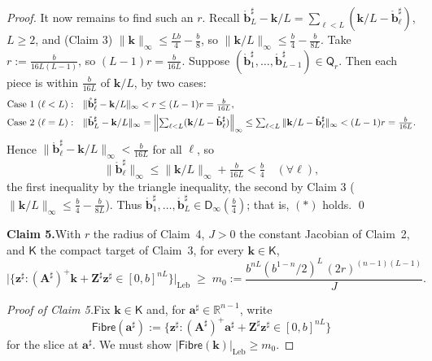 \documentclass[11pt]{article}
\theoremstyle{definition}
\begin{document}
\begin{proof}
\smallskip
\noindent It now remains to find such an $r$. Recall $\mathring{\mathbf{b}}^{\sharp}_L-\mathbf{k}/L=\sum_{\ell<L}(\mathbf{k}/L-\mathring{\mathbf{b}}^{\sharp}_\ell)$, $L\geq 2$, and (Claim 3) $\|\mathbf{k}\|_\infty\leq\tfrac{Lb}{4}-\tfrac{b}{8}$, so $\|\mathbf{k}/L\|_\infty\leq\tfrac{b}{4}-\tfrac{b}{8L}$. Take $r:=\tfrac{b}{16L(L-1)}$, so $(L-1)r=\tfrac{b}{16L}$. Suppose $(\mathring{\mathbf{b}}^{\sharp}_1,\ldots,\mathring{\mathbf{b}}^{\sharp}_{L-1})\in\mathsf{Q}_r$. Then each piece is within $\tfrac{b}{16L}$ of $\mathbf{k}/L$, by two cases:
\begin{align*}
\text{Case 1}\ (\ell<L):\quad
  &\|\mathring{\mathbf{b}}^{\sharp}_\ell-\mathbf{k}/L\|_\infty < r \leq (L-1)r = \tfrac{b}{16L}, \\
\text{Case 2}\ (\ell=L):\quad
  &\|\mathring{\mathbf{b}}^{\sharp}_L-\mathbf{k}/L\|_\infty = \Bigl\|\textstyle\sum_{\ell<L}(\mathbf{k}/L-\mathring{\mathbf{b}}^{\sharp}_\ell)\Bigr\|_\infty \leq \textstyle\sum_{\ell<L}\|\mathbf{k}/L-\mathring{\mathbf{b}}^{\sharp}_\ell\|_\infty < (L-1)r = \tfrac{b}{16L}.
\end{align*}
Hence $\|\mathring{\mathbf{b}}^{\sharp}_\ell-\mathbf{k}/L\|_\infty<\tfrac{b}{16L}$ for all $\ell$, so
\[
  \|\mathring{\mathbf{b}}^{\sharp}_\ell\|_\infty \leq \|\mathbf{k}/L\|_\infty + \tfrac{b}{16L} < \tfrac{b}{4} \quad(\forall\ell),
\]
the first inequality by the triangle inequality, the second by Claim 3 ($\|\mathbf{k}/L\|_\infty\leq\tfrac{b}{4}-\tfrac{b}{8L}$). Thus $\mathring{\mathbf{b}}^{\sharp}_1,\ldots,\mathring{\mathbf{b}}^{\sharp}_L\in\mathsf{D}_\infty(\tfrac{b}{4})$; that is, $(\ast)$ holds. \qed

\smallskip\noindent\textbf{Claim 5.}\quad With $r$ the radius of Claim~4, $J>0$ the constant Jacobian of Claim~2, and $\mathsf{K}$ the compact target of Claim~3, for every $\mathbf{k}\in\mathsf{K}$,
\[
  \bigl|\{\mathbf{z}^{\sharp} : (\mathbf{A}^{\sharp})^{+}\mathbf{k}+\mathbf{Z}^{\sharp}\mathbf{z}^{\sharp}\in[0,b]^{nL}\}\bigr|_{\mathrm{Leb}} \;\geq\; m_0 := \frac{b^{nL}(b^{1-n}/2)^L\,(2r)^{(n-1)(L-1)}}{J}.
\]

\noindent\emph{Proof of Claim 5.}\quad Fix $\mathbf{k}\in\mathsf{K}$ and, for $\mathbf{a}^{\sharp}\in\mathbb{R}^{n-1}$, write
\[
  \mathsf{Fibre}(\mathbf{a}^{\sharp}) := \{\mathbf{z}^{\sharp} : (\mathbf{A}^{\sharp})^{+}\mathbf{a}^{\sharp}+\mathbf{Z}^{\sharp}\mathbf{z}^{\sharp}\in[0,b]^{nL}\}
\]
for the slice at $\mathbf{a}^{\sharp}$. We must show $|\mathsf{Fibre}(\mathbf{k})|_{\mathrm{Leb}}\geq m_0$.


\end{proof}
\end{document}
